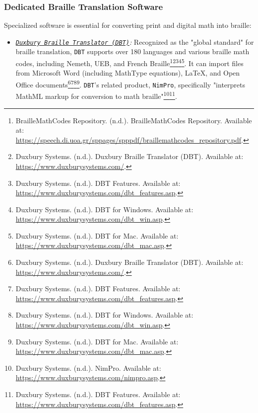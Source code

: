 \subsubsection{Dedicated Braille Translation Software}
Specialized software is essential for converting print and digital math into braille:
\begin{itemize}
    \item \emph{\href{https://www.duxburysystems.com/}{\texttt{Duxbury Braille Translator (DBT)}}:} Recognized as the "global standard" for braille translation, \texttt{DBT} supports over 180 languages and various braille math codes, including Nemeth, UEB, and French Braille\footnote{BrailleMathCodes Repository. (n.d.). BrailleMathCodes Repository. Available at: \url{https://speech.di.uoa.gr/sppages/spppdf/braillemathcodes_repository.pdf}.}\footnote{Duxbury Systems. (n.d.). Duxbury Braille Translator (DBT). Available at: \url{https://www.duxburysystems.com/}.}\footnote{Duxbury Systems. (n.d.). DBT Features. Available at: \url{https://www.duxburysystems.com/dbt_features.asp}.}\footnote{Duxbury Systems. (n.d.). DBT for Windows. Available at: \url{https://www.duxburysystems.com/dbt_win.asp}.}\footnote{Duxbury Systems. (n.d.). DBT for Mac. Available at: \url{https://www.duxburysystems.com/dbt_mac.asp}.}. It can import files from Microsoft Word (including MathType equations), LaTeX, and Open Office documents\footnote{Duxbury Systems. (n.d.). Duxbury Braille Translator (DBT). Available at: \url{https://www.duxburysystems.com/}.}\footnote{Duxbury Systems. (n.d.). DBT Features. Available at: \url{https://www.duxburysystems.com/dbt_features.asp}.}\footnote{Duxbury Systems. (n.d.). DBT for Windows. Available at: \url{https://www.duxburysystems.com/dbt_win.asp}.}\footnote{Duxbury Systems. (n.d.). DBT for Mac. Available at: \url{https://www.duxburysystems.com/dbt_mac.asp}.}. \texttt{DBT}'s related product, \texttt{NimPro}, specifically "interprets MathML markup for conversion to math braille"\footnote{Duxbury Systems. (n.d.). NimPro. Available at: \url{https://www.duxburysystems.com/nimpro.asp}.}\footnote{Duxbury Systems. (n.d.). DBT Features. Available at: \url{https://www.duxburysystems.com/dbt_features.asp}.}.

\end{itemize}
